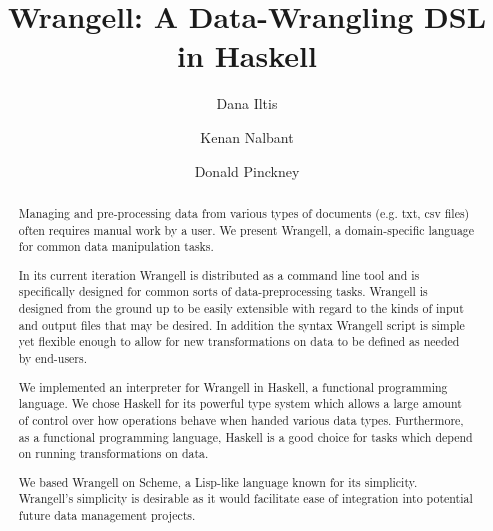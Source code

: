 \documentclass[preprint,nocopyrightspace]{sig-alternate}
\begin{document}
%

\title{Wrangell: A Data-Wrangling DSL in Haskell}

\author{Dana Iltis}
\author{Kenan Nalbant}
\author{Donald Pinckney}


\maketitle

\begin{abstract}
Managing and pre-processing data from various types of documents (e.g. txt, csv files) often requires manual work by a user. We present Wrangell, a domain-specific language for common data manipulation tasks.

\begin{comment}
Run from the command line, Wrangell is specifically designed to modify tables of data wherein columns are separated by a user-specified delimiter. Wrangell has functions to read in a file, parse the data, run a transformation on the table, and write the modified table to an output file. 
\end{comment}

In its current iteration Wrangell is distributed as a command line tool and is specifically designed for common sorts of data-preprocessing tasks. Wrangell is designed from the ground up to be easily extensible with regard to the kinds of input and output files that may be desired. In addition the syntax Wrangell script is simple yet flexible enough to allow for new transformations on data to be defined as needed by end-users.


We implemented an interpreter for Wrangell in Haskell, a functional programming language. We chose Haskell for its powerful type system which allows a large amount of control over how operations behave when handed various data types. Furthermore, as a functional programming language, Haskell is a good choice for tasks which depend on running transformations on data.

We based Wrangell on Scheme, a Lisp-like language known for its simplicity. Wrangell's simplicity is desirable as it would facilitate ease of integration into potential future data management projects.


\end{abstract}
\end{document}
